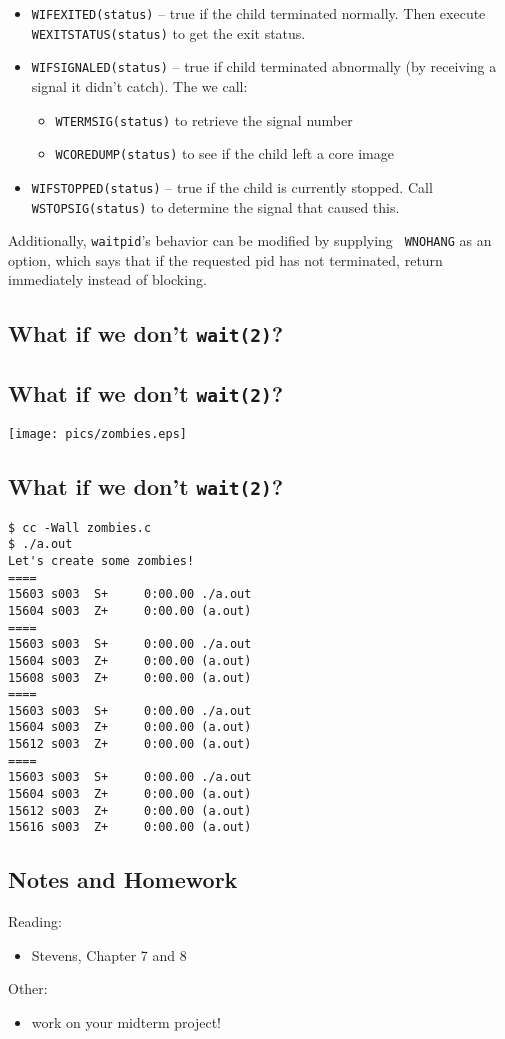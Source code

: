 \documentclass[xga]{xdvislides}
\begin{document}
\begin{itemize}
	\item {\tt WIFEXITED(status)} -- true if the child terminated normally.
		Then execute {\tt WEXITSTATUS(status)} to get the exit status.
	\item {\tt WIFSIGNALED(status)} -- true if child terminated abnormally
		(by receiving a signal it didn't catch). The we call:
		\begin{itemize}
			\item {\tt WTERMSIG(status)} to retrieve the signal number
			\item {\tt WCOREDUMP(status)} to see if the child left a core image
		\end{itemize}
	\item {\tt WIFSTOPPED(status)} -- true if the child is currently stopped.
		Call {\tt WSTOPSIG(status)} to determine the signal that caused this.
\end{itemize}

Additionally, {\tt waitpid}'s behavior can be modified by supplying {\tt
WNOHANG} as an option, which says that if the requested pid has not
terminated, return immediately instead of blocking.

\subsection{What if we don't {\tt wait(2)}?}

\subsection{What if we don't {\tt wait(2)}?}
\vspace*{\fill}
\begin{center}
	\texttt{[image: pics/zombies.eps]}
\end{center}
\vspace*{\fill}

\subsection{What if we don't {\tt wait(2)}?}
\smallish
\begin{verbatim}
$ cc -Wall zombies.c
$ ./a.out
Let's create some zombies!
====
15603 s003  S+     0:00.00 ./a.out
15604 s003  Z+     0:00.00 (a.out)
====
15603 s003  S+     0:00.00 ./a.out
15604 s003  Z+     0:00.00 (a.out)
15608 s003  Z+     0:00.00 (a.out)
====
15603 s003  S+     0:00.00 ./a.out
15604 s003  Z+     0:00.00 (a.out)
15612 s003  Z+     0:00.00 (a.out)
====
15603 s003  S+     0:00.00 ./a.out
15604 s003  Z+     0:00.00 (a.out)
15612 s003  Z+     0:00.00 (a.out)
15616 s003  Z+     0:00.00 (a.out)

\end{verbatim}

\subsection{Notes and Homework}

Reading:
\begin{itemize}
	\item Stevens, Chapter 7 and 8
\end{itemize}
Other:
\begin{itemize}
	\item work on your midterm project!
\end{itemize}
\end{document}
